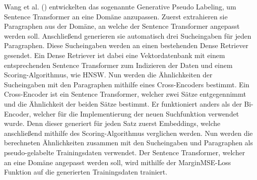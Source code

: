 Wang et al. (\citeyear{Wang_Thakur_Reimers_Gurevych_2022}) entwickelten das sogenannte Generative Pseudo Labeling, um Sentence Transformer an eine Domäne anzupassen.
Zuerst extrahieren sie Paragraphen aus der Domäne, an welche der Sentence Transformer angepasst werden soll.
Anschließend generieren sie automatisch drei Sucheingaben für jeden Paragraphen.
Diese Sucheingaben werden an einen bestehenden Dense Retriever gesendet.
Ein Dense Retriever ist dabei eine Vektordatenbank mit einem entsprechenden Sentence Transformer zum Indizieren der Daten und einem Scoring-Algorithmus, wie HNSW. 
Nun werden die Ähnlichkeiten der Sucheingaben mit den Paragraphen mithilfe eines Cross-Encoders bestimmt.
Ein Cross-Encoder ist ein Sentence Transformer, welcher zwei Sätze entgegennimmt und die Ähnlichkeit der beiden Sätze bestimmt.
Er funktioniert anders als der Bi-Encoder, welcher für die Implementierung der neuen Suchfunktion verwendet wurde.
Denn dieser generiert für jeden Satz zuerst Embeddings, welche anschließend mithilfe des Scoring-Algorithmus verglichen werden.
Nun werden die berechneten Ähnlichkeiten zusammen mit den Sucheingaben und Paragraphen als pseudo-gelabelte Trainingsdaten verwendet.
Der Sentence Transformer, welcher an eine Domäne angepasst werden soll, wird mithilfe der MarginMSE-Loss Funktion auf die generierten Trainingsdaten trainiert.\\  

